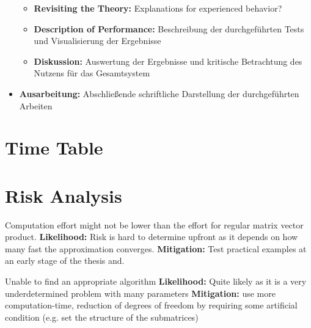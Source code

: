 \documentclass[lang=ngerman,inputenc=utf8,fontsize=10pt]{ldvarticle}
\begin{document}
\begin{itemize}
		\begin{itemize}
			\item \textbf{Revisiting the Theory:} Explanations for experienced behavior?
			\item \textbf{Description of Performance:} Beschreibung der durchgeführten Tests und Visualisierung der Ergebnisse
			\item \textbf{Diskussion:} Auswertung der Ergebnisse und kritische Betrachtung des Nutzens für das Gesamtsystem
		\end{itemize}
	\item \textbf{Ausarbeitung:} Abschließende schriftliche Darstellung der durchgeführten Arbeiten
\end{itemize}

\section{Time Table}









\section{Risk Analysis}

Computation effort might not be lower than the effort for regular matrix vector product.
\newline\textbf{Likelihood:} Risk is hard to determine upfront as it depends on how many fast the approximation converges.
\newline\textbf{Mitigation:} Test practical examples at an early stage of the thesis and.

Unable to find an appropriate algorithm
\newline\textbf{Likelihood:} Quite likely as it is a very underdetermined problem with many parameters
\newline\textbf{Mitigation:} use more computation-time, reduction of degrees of freedom by requiring some artificial condition (e.g. set the structure of the submatrices)


\printbibliography
\end{document}
